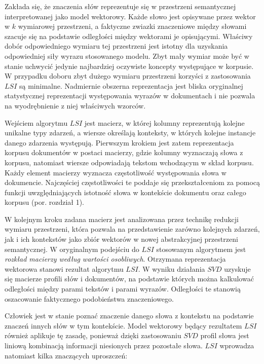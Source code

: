 \documentclass{pracamgr}
\begin{document}
Zakłada się, że znaczenia słów reprezentuje się w przestrzeni semantycznej interpretowanej jako model wektorowy. Każde słowo jest opisywane przez wektor w $k$ wymiarowej przestrzeni, a faktyczne zwiazki znaczeniowe między słowami szacuje się na podstawie odległości między wektorami je opisującymi. Właściwy dobór odpowiedniego wymiaru tej przestrzeni jest istotny dla uzyskania odpowiedniej siły wyrazu stosowanego modelu. Zbyt mały wymiar może być w stanie uchwycić jedynie najbardziej oczywiste koncepty występujące w korpusie. W przypadku doboru zbyt dużego wymiaru przestrzeni korzyści z zastosowania $LSI$ są minimalne. Nadmiernie obszerna reprezentacja jest bliska oryginalnej statystycznej reprezentacji występowania wyrazów w dokumentach i nie pozwala na wyodrębnienie z niej właściwych wzorców.

Wejściem algorytmu $LSI$ jest macierz, w której kolumny reprezentują kolejne unikalne typy zdarzeń, a wiersze określają konteksty, w których kolejne instancje danego zdarzenia występują. Pierwszym krokiem jest zatem reprezentacja korpusu dokumentów w postaci macierzy, gdzie kolumny wyznaczają słowa z korpusu, natomiast wiersze odpowiadają tekstom wchodzącym w skład korpusu. Każdy element macierzy wyznacza częstotliwość występowania słowa w dokumencie. Najczęściej częstotliwości te poddaje się przekształceniom za pomocą funkcji uwzględniających istotność słowa w kontekście dokumentu oraz całego korpusu (por. rozdział 1).

W kolejnym kroku zadana macierz jest analizowana przez technikę redukcji wymiaru przestrzeni, która pozwala na przedstawienie zarówno kolejnych zdarzeń, jak i ich kontekstów jako zbiór wektorów w nowej abstrakcyjnej przestrzeni semantycznej. W oryginalnym podejściu do $LSI$ stosowanym algorytmem jest \textit{rozkład macierzy według wartości osobliwych}. Otrzymana reprezentacja wektorowa stanowi rezultat algorytmu $LSI$. W wyniku działania $SVD$ uzyskuje się macierze profili słów i dokumentów, na podstawie których można kalkulować odległości między parami tekstów i parami wyrazów. Odległości te stanowią oszacowanie faktycznego podobieństwa znaczeniowego.

Człowiek jest w stanie poznać znaczenie danego słowa z kontekstu na podstawie znaczeń innych słów w tym kontekście. Model wektorowy będący rezultatem $LSI$ również aplikuje tę zasadę, ponieważ dzięki zastosowaniu $SVD$ profil słowa jest liniową kombinacją informacji niesionych przez pozostałe słowa. $LSI$ wprowadza natomiast kilka znaczących uproszczeń:
\end{document}
